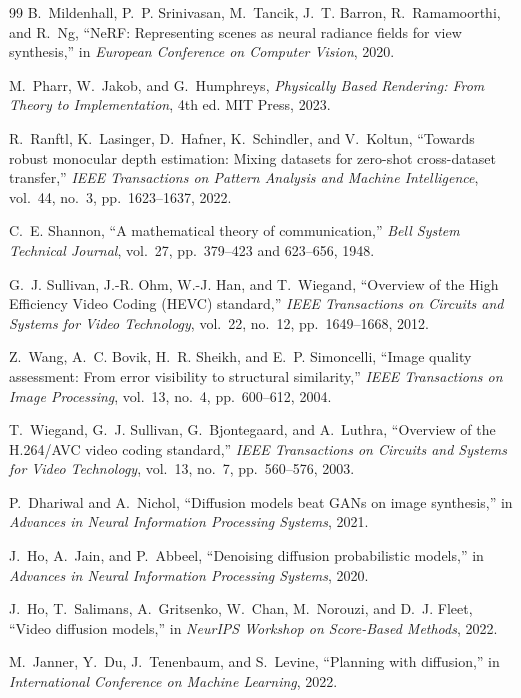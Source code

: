 \documentclass[12pt,a4paper]{article}
\theoremstyle{plain}
\theoremstyle{definition}
\theoremstyle{remark}
\begin{document}
\begin{thebibliography}{99}
B.~Mildenhall, P.~P. Srinivasan, M.~Tancik, J.~T. Barron, R.~Ramamoorthi, and R.~Ng, ``NeRF: Representing scenes as neural radiance fields for view synthesis,'' in \textit{European Conference on Computer Vision}, 2020.

M.~Pharr, W.~Jakob, and G.~Humphreys, \textit{Physically Based Rendering: From Theory to Implementation}, 4th ed. MIT Press, 2023.

R.~Ranftl, K.~Lasinger, D.~Hafner, K.~Schindler, and V.~Koltun, ``Towards robust monocular depth estimation: Mixing datasets for zero-shot cross-dataset transfer,'' \textit{IEEE Transactions on Pattern Analysis and Machine Intelligence}, vol.~44, no.~3, pp.~1623--1637, 2022.

C.~E. Shannon, ``A mathematical theory of communication,'' \textit{Bell System Technical Journal}, vol.~27, pp.~379--423 and 623--656, 1948.

G.~J. Sullivan, J.-R. Ohm, W.-J. Han, and T.~Wiegand, ``Overview of the High Efficiency Video Coding (HEVC) standard,'' \textit{IEEE Transactions on Circuits and Systems for Video Technology}, vol.~22, no.~12, pp.~1649--1668, 2012.

Z.~Wang, A.~C. Bovik, H.~R. Sheikh, and E.~P. Simoncelli, ``Image quality assessment: From error visibility to structural similarity,'' \textit{IEEE Transactions on Image Processing}, vol.~13, no.~4, pp.~600--612, 2004.

T.~Wiegand, G.~J. Sullivan, G.~Bjontegaard, and A.~Luthra, ``Overview of the H.264/AVC video coding standard,'' \textit{IEEE Transactions on Circuits and Systems for Video Technology}, vol.~13, no.~7, pp.~560--576, 2003.


P.~Dhariwal and A.~Nichol, ``Diffusion models beat GANs on image synthesis,'' in \textit{Advances in Neural Information Processing Systems}, 2021.

J.~Ho, A.~Jain, and P.~Abbeel, ``Denoising diffusion probabilistic models,'' in \textit{Advances in Neural Information Processing Systems}, 2020.

J.~Ho, T.~Salimans, A.~Gritsenko, W.~Chan, M.~Norouzi, and D.~J. Fleet, ``Video diffusion models,'' in \textit{NeurIPS Workshop on Score-Based Methods}, 2022.

M.~Janner, Y.~Du, J.~Tenenbaum, and S.~Levine, ``Planning with diffusion,'' in \textit{International Conference on Machine Learning}, 2022.


\end{thebibliography}
\end{document}
